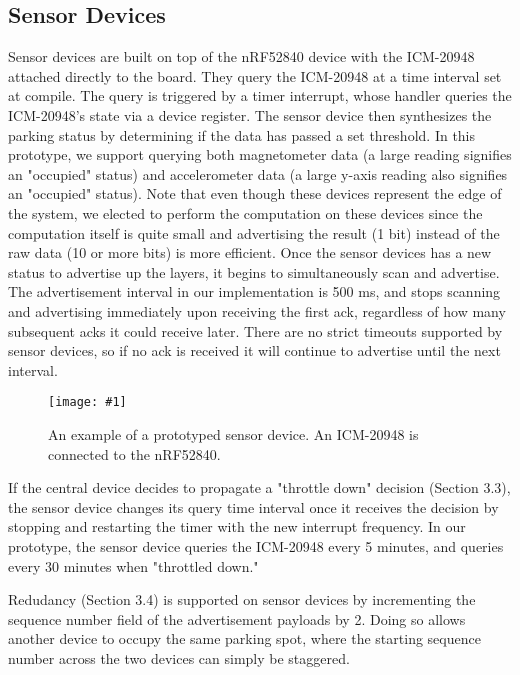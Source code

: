 \documentclass[sigconf]{acmart}
\def\mediumcolfig#1{\texttt{[image: \#1]}}
\begin{document}
\subsection{Sensor Devices}
Sensor devices are built on top of the nRF52840 device with the ICM-20948
attached directly to the board. They query the ICM-20948 at a time interval
set at compile. The query is triggered by a timer interrupt, whose handler
queries the ICM-20948's state via a device register. The sensor device then
synthesizes the parking status by determining if the data has passed a set
threshold. In this prototype, we support querying both magnetometer data (a
large reading signifies an "occupied" status) and accelerometer data (a large
y-axis reading also signifies an "occupied" status). Note that even though
these devices represent the edge of the system, we elected to perform the
computation on these devices since the computation itself is quite small and
advertising the result (1 bit) instead of the raw data (10 or more bits) is
more efficient. Once the sensor devices has a new status to advertise up the layers, it
begins to simultaneously scan and advertise. The advertisement interval in
our implementation is 500 ms, and stops scanning and advertising immediately
upon receiving the first ack, regardless of how many subsequent acks it could
receive later. There are no strict timeouts supported by sensor devices, so
if no ack is received it will continue to advertise until the next interval. \newline

\begin{figure}
  \centerline{\mediumcolfig{figs/sensor.pdf}}
    \caption{An example of a prototyped sensor device. An ICM-20948 is
    connected to the nRF52840.}
    \label{fig:webserver}
\end{figure}

If the central device decides to propagate a "throttle down" decision (Section
3.3), the sensor device changes its query time interval once it receives
the decision by stopping and restarting the timer with the new interrupt
frequency. In our prototype, the sensor device queries the ICM-20948 every
5 minutes, and queries every 30 minutes when "throttled down." \newline

Redudancy (Section 3.4) is supported on sensor devices by incrementing the
sequence number field of the advertisement payloads by 2. Doing so allows
another device to occupy the same parking spot, where the starting sequence
number across the two devices can simply be staggered.
\end{document}
